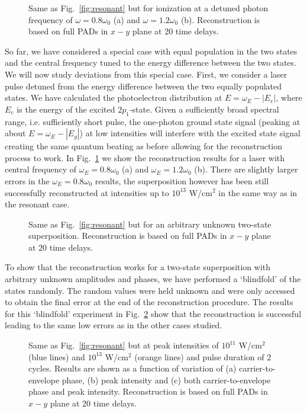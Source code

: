 \begin{figure}[t]
\centering
\caption{
Same as Fig.\ \ref{fig:resonant} but for ionization at a detuned photon frequency of $\omega=0.8\omega_0$ (a) and $\omega=1.2\omega_0$ (b).
Reconstruction is based on full PADs in $x-y$ plane at 20 time delays.
} 
  \label{fig:detuned}
\end{figure}

So far, we have considered a special case with equal population in the two states and the central frequency tuned to the energy difference between the two states. We will now study deviations from this special case. First, we consider a laser pulse detuned from the energy difference between the two equally populated states. We have calculated the photoelectron distribution at $E=\omega_E-|E_e|$, where $E_e$ is the energy of the excited $2p_1$-state. Given a sufficiently broad spectral range, i.e. sufficiently short pulse, the one-photon ground state signal (peaking at about $E = \omega_E-|E_g|$) at low intensities will interfere with the excited state signal creating the same quantum beating as before allowing for the reconstruction process to work. In Fig.~\ref{fig:detuned} we show the reconstruction results for a laser with central frequency of $\omega_E = 0.8\omega_0$ (a) and $\omega_E = 1.2\omega_0$ (b). 
There are slightly larger errors in the $\omega_E=0.8\omega_0$ results, the superposition however has been still successfully reconstructed at intensities up to $10^{13}$ W/cm$^2$ in the same way as in the resonant case.

\begin{figure}[t]
\centering
\caption{
Same as Fig.\ \ref{fig:resonant} but for an arbitrary unknown two-state superposition. Reconstruction is based on full PADs in $x-y$ plane at 20 time delays. 
} 
  \label{fig:random_state}
\end{figure}

To show that the reconstruction works for a two-state superposition with arbitrary unknown amplitudes and phases, we have performed a `blindfold' of the states randomly. The random values were held unknown and were only accessed to obtain the final error at the end of the reconstruction procedure. The results for this `blindfold' experiment in Fig.~\ref{fig:random_state} show that the reconstruction is successful leading to the same low errors as in the other cases studied.

\begin{figure}[t]
\centering
\caption{
Same as Fig.\ \ref{fig:resonant} but at peak intensities of $10^{11}$ W/cm$^2$ (blue lines) and $10^{13}$ W/cm$^2$ (orange lines) and pulse duration of 2 cycles. Results are shown as a function of variation of (a) carrier-to-envelope phase, (b) peak intensity and (c) both carrier-to-envelope phase and peak intensity. Reconstruction is based on full PADs in $x-y$ plane at 20 time delays.
} 
  \label{fig:noise}
\end{figure}

